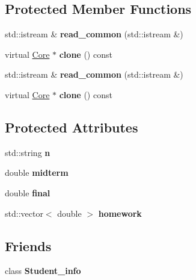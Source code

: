 \subsection*{Protected Member Functions}
\begin{DoxyCompactItemize}
\item 
\mbox{\label{classCore_a357e613c5ceab22af89eb400fab58472}} 
std\+::istream \& {\bfseries read\+\_\+common} (std\+::istream \&)
\item 
\mbox{\label{classCore_ae781fdf236da68fabe00b8207608078b}} 
virtual \hyperlink{classCore}{Core} $\ast$ {\bfseries clone} () const
\item 
\mbox{\label{classCore_a357e613c5ceab22af89eb400fab58472}} 
std\+::istream \& {\bfseries read\+\_\+common} (std\+::istream \&)
\item 
\mbox{\label{classCore_ae781fdf236da68fabe00b8207608078b}} 
virtual \hyperlink{classCore}{Core} $\ast$ {\bfseries clone} () const
\end{DoxyCompactItemize}
\subsection*{Protected Attributes}
\begin{DoxyCompactItemize}
\item 
\mbox{\label{classCore_ac0329babd9f22f8858acbedb9e4346dc}} 
std\+::string {\bfseries n}
\item 
\mbox{\label{classCore_a0af6c4fa1fe57bc1eb500d16dd546202}} 
double {\bfseries midterm}
\item 
\mbox{\label{classCore_aa6cd0056b25e33c985fc8e347b9ed377}} 
double {\bfseries final}
\item 
\mbox{\label{classCore_a8e9985533d221353e8d20fcee42e0f3b}} 
std\+::vector$<$ double $>$ {\bfseries homework}
\end{DoxyCompactItemize}
\subsection*{Friends}
\begin{DoxyCompactItemize}
\item 
\mbox{\label{classCore_a0bedab406577c0c9300433087863c413}} 
class {\bfseries Student\+\_\+info}
\end{DoxyCompactItemize}


